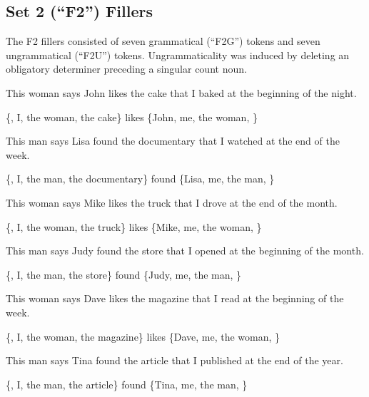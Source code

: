 \subsection{Set 2 (``F2'') Fillers}

\vspace{0.2cm}

The F2 fillers consisted of seven grammatical (``F2G'') tokens and seven ungrammatical (``F2U'') tokens. Ungrammaticality was induced by deleting an obligatory determiner preceding a singular count noun.

\vspace{0.2cm}

\pex %
\a[label=S] This woman says John likes the cake that I baked at the beginning of the night.\par\nobreak
\a[label=Q] \{, I, the woman, the cake\} likes \{John, me, the woman, \}
\xe

\pex %
\a[label=S] This man says Lisa found the documentary that I watched at the end of the week.\par\nobreak
\a[label=Q] \{, I, the man, the documentary\} found \{Lisa, me, the man, \}
\xe

\pex %
\a[label=S] This woman says Mike likes the truck that I drove at the end of the month.\par\nobreak
\a[label=Q] \{, I, the woman, the truck\} likes \{Mike, me, the woman, \}
\xe

\pex %
\a[label=S] This man says Judy found the store that I opened at the beginning of the month.\par\nobreak
\a[label=Q] \{, I, the man, the store\} found \{Judy, me, the man, \}
\xe

\pex %
\a[label=S] This woman says Dave likes the magazine that I read at the beginning of the week.\par\nobreak
\a[label=Q] \{, I, the woman, the magazine\} likes \{Dave, me, the woman, \}
\xe

\pex %
\a[label=S] This man says Tina found the article that I published at the end of the year.\par\nobreak
\a[label=Q] \{, I, the man, the article\} found \{Tina, me, the man, \}
\xe

